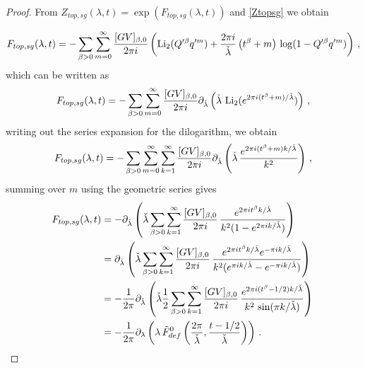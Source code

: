 \documentclass[a4paper,12pt,justification=centering]{article}
\numberwithin{equation}{section}
\newcommand{\ii}{\textnormal{i}}
\theoremstyle{plain}%
\theoremstyle{definition}
\begin{document}
\begin{proof}
From $
 Z_{top,sg}(\lambda,t)= \exp(F_{top,sg}(\lambda,t) )
$ and \eqref{Ztopsg} we obtain
 
\begin{align}
 F_{top,sg}(\lambda,t)=  -\sum_{\beta>0}  \sum_{m=0}^{\infty} \frac{[\textrm{GV}]_{\beta,0}}{2\pi i}  \left( \operatorname{Li}_2(Q'^{\beta} q'^m) +  \frac{ 2\pi \ii}{\check{\lambda}}\left( t^{\beta}+m\right) \,\log (1-Q'^{\beta} q'^m)\right) \,,
\end{align}
which can be written as
\begin{align}
 F_{top,sg}(\lambda,t)=  - \sum_{\beta>0}  \sum_{m=0}^{\infty} \frac{[\textrm{GV}]_{\beta,0}}{2\pi i} \partial_{\check{\lambda}} \left( \check{\lambda} \, \operatorname{Li}_2(e^{2\pi \ii (t^{\beta}+m)/\check{\lambda}})\right) \,,
\end{align}
writing out the series expansion for the dilogarithm, we obtain
\begin{align}
 F_{top,sg}(\lambda,t)=  - \sum_{\beta>0}  \sum_{m=0}^{\infty} \sum_{k=1}^{\infty} \frac{[\textrm{GV}]_{\beta,0}}{2\pi i} \partial_{\check{\lambda}} \left( \check{\lambda} \, \frac{e^{2\pi \ii (t^{\beta}+m)k/\check{\lambda}}}{k^2}\right) \,,
\end{align}
summing over $m$ using the geometric series gives
\begin{align}
 F_{top,sg}(\lambda,t)&=  -  \partial_{\check{\lambda}}  \left( \check{\lambda} \sum_{\beta>0}   \sum_{k=1}^{\infty} \frac{[\textrm{GV}]_{\beta,0}}{2\pi i}  \, \frac{e^{2\pi \ii t^{\beta}k/\check{\lambda}}}{k^2 (1-e^{2\pi \ii k/\check{\lambda}})} \right) \,\\
 &=    \partial_{\check{\lambda}}  \left( \check{\lambda} \sum_{\beta>0}   \sum_{k=1}^{\infty} \frac{[\textrm{GV}]_{\beta,0}}{2\pi i}  \, \frac{e^{2\pi \ii t^{\beta}k/\check{\lambda}}e^{-\pi \ii k/\check{\lambda}}}{k^2 (e^{\pi \ii k/\check{\lambda}}-e^{-\pi \ii k/\check{\lambda}})} \right) \,\\
  &=   -\frac{1}{2\pi} \partial_{\check{\lambda}}  \left( \check{\lambda} \frac{1}{2} \sum_{\beta>0}   \sum_{k=1}^{\infty} \frac{[\textrm{GV}]_{\beta,0}}{2\pi i}  \, \frac{e^{2\pi \ii (t^{\beta}-1/2)k/\check{\lambda}}}{k^2 \, \sin( \pi  k/\check{\lambda})} \right) \,\\&= -\frac{1}{2\pi} \partial_{\lambda} \left( \lambda \, \tilde{F}^{0}_{\textrm{def}} \left( \frac{2\pi}{\check{\lambda}}, \frac{t-1/2}{\check{\lambda}} \right)\right)\,.
\end{align}





\end{proof}
\end{document}
